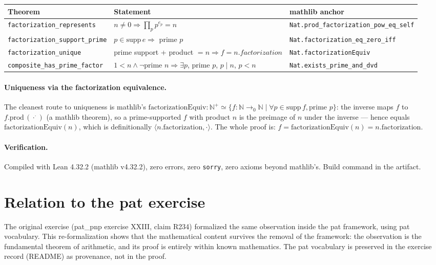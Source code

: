 \documentclass[sigplan,10pt,anonymous,review]{acmart}
\begin{document}
\begin{center}
\begin{tabular}{lll}
\toprule
Theorem & Statement & mathlib anchor \\
\midrule
\texttt{factorization\_represents} & $n \neq 0 \Rightarrow \prod_p p^{e_p} = n$
  & \texttt{Nat.prod\_factorization\_pow\_eq\_self} \\
\texttt{factorization\_support\_prime} & $p \in \mathrm{supp}\, e \Rightarrow$ prime $p$
  & \texttt{Nat.factorization\_eq\_zero\_iff} \\
\texttt{factorization\_unique} & prime support + product $= n \Rightarrow f = n.factorization$
  & \texttt{Nat.factorizationEquiv} \\
\texttt{composite\_has\_prime\_factor} & $1 < n \wedge \neg$prime $n \Rightarrow \exists p$, prime $p$, $p \mid n$, $p < n$
  & \texttt{Nat.exists\_prime\_and\_dvd} \\
\bottomrule
\end{tabular}
\end{center}

\paragraph{Uniqueness via the factorization equivalence.} The cleanest
route to uniqueness is mathlib's
$\mathrm{factorizationEquiv} : \mathbb{N}^+ \simeq \{ f : \mathbb{N}
\rightarrow_0 \mathbb{N} \mid \forall p \in \mathrm{supp}\, f, \text{prime } p \}$:
the inverse maps $f$ to $f.\mathrm{prod}\,(\cdot^\cdot)$ (a mathlib
theorem), so a prime-supported $f$ with product $n$ is the preimage of
$n$ under the inverse --- hence equals $\mathrm{factorizationEquiv}(n)$,
which is definitionally $\langle n.\mathrm{factorization}, \cdot\rangle$.
The whole proof is: $f = \mathrm{factorizationEquiv}(n) = n.\mathrm{factorization}$.

\paragraph{Verification.} Compiled with Lean 4.32.2 (mathlib v4.32.2),
zero errors, zero \texttt{sorry}, zero axioms beyond mathlib's. Build
command in the artifact.

\section{Relation to the pat exercise}

The original exercise (pat\_pnp exercise XXIII, claim R234) formalized the
same observation inside the pat framework, using pat vocabulary. This
re-formalization shows that the mathematical content survives the removal
of the framework: the observation is the fundamental theorem of
arithmetic, and its proof is entirely within known mathematics. The pat
vocabulary is preserved in the exercise record (README) as provenance, not
in the proof.
\end{document}

